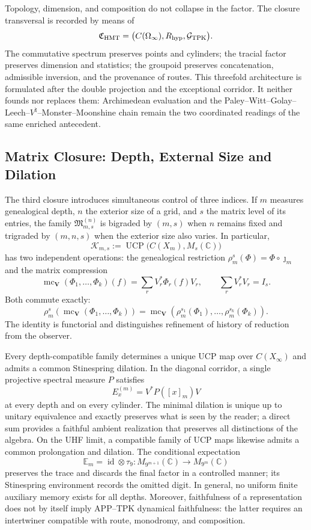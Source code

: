 Topology, dimension, and composition do not collapse in the factor. The closure
transversal is recorded by means of
\[
 \mathfrak C_{\rm HMT}
 =\bigl(C(\Omega_\infty),R_{\rm hyp},\mathcal G_{\rm TPK}\bigr).
\]
The commutative spectrum preserves points and cylinders; the tracial factor preserves dimension and statistics; the groupoid preserves concatenation, admissible inversion, and the provenance of routes. This threefold architecture is formulated after the double projection and the exceptional corridor. It neither founds nor replaces them: Archimedean evaluation and the Paley--Witt--Golay--Leech--\(V^\natural\)--Monster--Moonshine chain remain the two coordinated readings of the same enriched antecedent.

\subsection*{Matrix Closure: Depth, External Size and Dilation}

The third closure introduces simultaneous control of three indices. If \(m\) measures genealogical depth, \(n\) the exterior size of a grid, and \(s\) the matrix level of its entries, the family \(\mathfrak M_{m,s}^{(n)}\) is bigraded by \((m,s)\) when \(n\) remains fixed and trigraded by \((m,n,s)\) when the exterior size also varies. In particular,
\[
 \mathcal K_{m,s}
 :=\operatorname{UCP}\!\bigl(C(X_m),M_s(\mathbb C)\bigr)
\]
has two independent operations: the genealogical restriction
\(\rho_m^s(\Phi)=\Phi\circ\jmath_m\) and the matrix compression
\[
 \operatorname{mc}_{\boldsymbol V}(\Phi_1,\ldots,\Phi_k)(f)
 =\sum_rV_r^*\Phi_r(f)V_r,
 \qquad \sum_rV_r^*V_r=I_s.
\]
Both commute exactly:
\[
 \rho_m^s\!\left(\operatorname{mc}_{\boldsymbol V}(\Phi_1,\ldots,\Phi_k)\right)
 =\operatorname{mc}_{\boldsymbol V}\!\left(
   \rho_m^{s_1}(\Phi_1),\ldots,\rho_m^{s_k}(\Phi_k)\right).
\]
The identity is functorial and distinguishes refinement of history of reduction from the observer.

Every depth-compatible family determines a unique UCP map
over \(C(X_\infty)\) and admits a common Stinespring dilation. In the
diagonal corridor, a single projective spectral measure \(P\) satisfies
\[
 E_x^{(m)}=V^*P([x]_m)V
\]
at every depth and on every cylinder. The minimal dilation is unique up to
unitary equivalence and exactly preserves what is seen by the reader; a direct sum
provides a faithful ambient realization that preserves all distinctions of the
algebra. On the UHF limit, a compatible family of UCP maps likewise admits a common
prolongation and dilation. The conditional expectation
\[
 \mathbb E_m=\operatorname{id}\otimes\tau_9:
 M_{9^{m+1}}(\mathbb C)\longrightarrow M_{9^m}(\mathbb C)
\]
preserves the trace and discards the final factor in a controlled manner; its Stinespring environment records the omitted digit. In general, no uniform finite auxiliary memory exists for all depths. Moreover, faithfulness of a representation does not by itself imply APP--TPK dynamical faithfulness: the latter requires an intertwiner compatible with route, monodromy, and composition.

